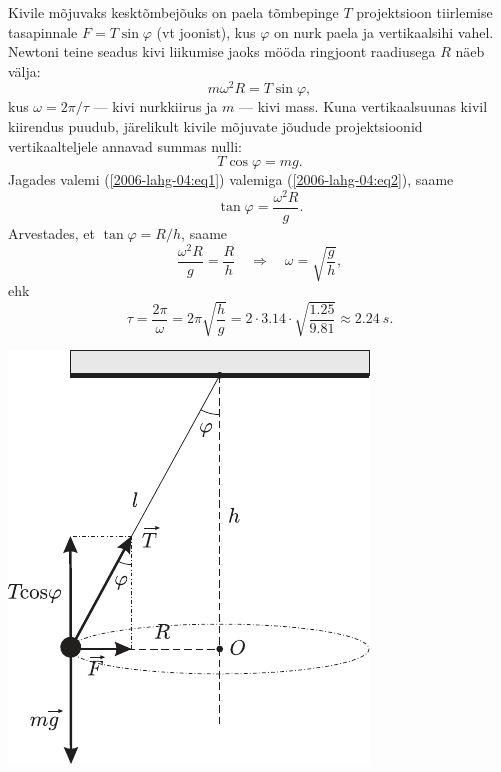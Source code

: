 \documentclass[10pt, twoside]{article}
\begin{document}
{
\solu
Kivile mõjuvaks kesktõmbejõuks on paela tõmbepinge $T$ projektsioon tiirlemise
tasapinnale $F = T \sin \varphi$ (vt joonist), kus $\varphi$ on nurk paela ja vertikaalsihi vahel. Newtoni teine seadus kivi liikumise jaoks mööda ringjoont raadiusega $R$ näeb välja:
\begin{equation} \label{2006-lahg-04:eq1}
m\omega^2R = T \sin \varphi,
\end{equation}
kus $\omega = 2\pi /\tau$ --- kivi nurkkiirus ja $m$ --- kivi mass. Kuna vertikaalsuunas kivil kiirendus puudub, järelikult kivile mõjuvate jõudude projektsioonid vertikaalteljele annavad summas nulli:
\begin{equation} \label{2006-lahg-04:eq2}
T \cos\varphi = mg.
\end{equation}
Jagades valemi (\ref{2006-lahg-04:eq1}) valemiga (\ref{2006-lahg-04:eq2}), saame
\[
\tan \varphi = \frac{\omega^2R}{g}.
\]
Arvestades, et $\tan \varphi = R/h$, saame
\[
\frac{\omega^{2} R}{g}=\frac{R}{h} \quad \Rightarrow \quad \omega=\sqrt{\frac{g}{h}},
\]
ehk
\[
\tau=\frac{2 \pi}{\omega}=2 \pi \sqrt{\frac{h}{g}}=2 \cdot \num{3,14} \cdot \sqrt{\frac{\num{1,25}}{\num{9,81}}} \approx \SI{2,24}{s}.
\]

\begin{center}
	\includegraphics[width=0.7\linewidth]{2006-lahg-04-lah}
\end{center}
\probend
\bigskip


}
\end{document}
